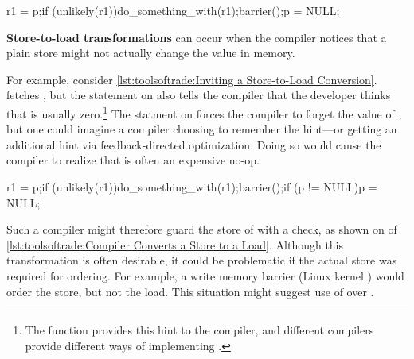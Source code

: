 \begin{listing}
\begin{fcvlabel}
\begin{VerbatimL}[commandchars=\\\[\]]
r1 = p;\lnlbl[load:p]
if (unlikely(r1))\lnlbl[if]
	do_something_with(r1);\lnlbl[dsw]
barrier();\lnlbl[barrier]
p = NULL;\lnlbl[null]
\end{VerbatimL}
\end{fcvlabel}
\caption{Inviting a Store-to-Load Conversion}
\label{lst:toolsoftrade:Inviting a Store-to-Load Conversion}
\end{listing}

{\bf Store-to-load transformations} can occur when the compiler notices
that a plain store might not actually change the value in memory.
\begin{fcvref}
For example, consider
\cref{lst:toolsoftrade:Inviting a Store-to-Load Conversion}.
 fetches , but the  statement on
 also tells the compiler that the developer thinks that
 is usually zero.\footnote{
	The  function provides this hint to the compiler,
	and different compilers provide different ways of implementing
	.}
The  statment on  forces the compiler
to forget the value of , but one could imagine a compiler
choosing to remember the hint---or getting an additional hint via
feedback-directed optimization.
Doing so would cause the compiler to realize that 
is often an expensive no-op.
\end{fcvref}

\begin{listing}
\begin{fcvlabel}
\begin{VerbatimL}[commandchars=\\\[\]]
r1 = p;\lnlbl[load:p]
if (unlikely(r1))\lnlbl[if]
	do_something_with(r1);\lnlbl[dsw]
barrier();\lnlbl[barrier]
if (p != NULL)\lnlbl[if1]
	p = NULL;\lnlbl[null]
\end{VerbatimL}
\end{fcvlabel}
\caption{Compiler Converts a Store to a Load}
\label{lst:toolsoftrade:Compiler Converts a Store to a Load}
\end{listing}

\begin{fcvref}
Such a compiler might therefore guard the store of 
with a check, as shown on  of
\cref{lst:toolsoftrade:Compiler Converts a Store to a Load}.
Although this transformation is often desirable, it could be problematic
if the actual store was required for ordering.
For example, a write memory barrier (Linux kernel ) would
order the store, but not the load.
This situation might suggest use of  over
.
\end{fcvref}

